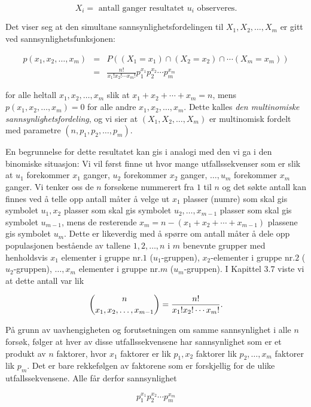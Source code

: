 \[ X_i= \mbox{\ \ antall ganger resultatet $u_i$ observeres.} \]

\noindent Det viser seg at den simultane sannsynlighetsfordelingen til
$X_1, X_2, \ldots , X_m$ er gitt ved sannsynlighetsfunksjonen:

\begin{eqnarray*}
 p(x_1,x_2,\ldots ,x_m)&=&P((X_1=x_1)\cap (X_2=x_2)\cap \cdots (X_m=x_m)) \\
&=&\frac{n!}{x_1!x_2!\cdots x_m!}p_1^{x_1}p_2^{x_2}\cdots p_m^{x_m}
\end{eqnarray*}

\noindent for alle heltall $x_1, x_2, \ldots, x_m$ slik at $x_1+x_2+\cdots
+x_m=n$, mens $p(x_1, x_2, \ldots, x_m)=0$ for alle andre $x_1, x_2,
\ldots, x_m$. Dette kalles {\em den multinomiske
sannsynlighetsfordeling}, og vi sier at $(X_1, X_2, \ldots, X_m)$ er
multinomisk fordelt med parametre $(n, p_1, p_2, \ldots, p_m)$.

En begrunnelse for dette resultatet kan gis i analogi med den vi ga
i den binomiske situasjon: Vi vil først finne ut hvor mange
utfallssekvenser som er slik at $u_1$ forekommer $x_1$ ganger,
$u_2$ forekommer $x_2$ ganger, $\ldots, u_m$ forekommer $x_m$
ganger. Vi tenker oss de $n$ forsøkene nummerert fra $1$ til $n$
og det søkte antall kan finnes ved å telle opp antall måter å
velge ut $x_1$ plasser (numre) som skal gis symbolet $u_1, x_2$
plasser som skal gis symbolet $u_2, \ldots, x_{m-1}$ plasser som
skal gis symbolet $u_{m-1}$, mens de resterende $x_m=n-(x_1+x_2+
\cdots +x_{m-1})$ plassene gis symbolet $u_m$. Dette er
likeverdig med å spørre om antall måter å dele opp populasjonen
bestående av tallene $1, 2, \ldots, n$ i $m$ benevnte grupper med
henholdsvis $x_1$ elementer i gruppe nr.$1$ ($u_1$-gruppen),
$x_2$-elementer i gruppe nr.$2$ ($u_2$-gruppen), $\ldots, x_m$
elementer i gruppe nr.$m$ ($u_m$-gruppen). I Kapittel 3.7 viste
vi at dette antall var lik

\[ {{n}\choose{x_1,x_2,\ldots ,x_{m-1}}}=\frac{n!}{x_1!x_2!\cdots x_m!}.\] 

\noindent På grunn av uavhengigheten og forutsetningen om samme
sannsynlighet i alle $n$ forsøk, følger at hver av disse
utfallssekvensene har sannsynlighet som er et produkt av $n$
faktorer, hvor $x_1$ faktorer er lik $p_1, x_2$ faktorer lik
$p_2, \ldots, x_m$ faktorer lik $p_m$. Det er bare rekkefølgen av
faktorene som er forskjellig for de ulike utfallssekvensene. Alle
får derfor sannsynlighet

\[   p_1^{x_1}p_2^{x_2}\cdots p_m^{x_m} \]

